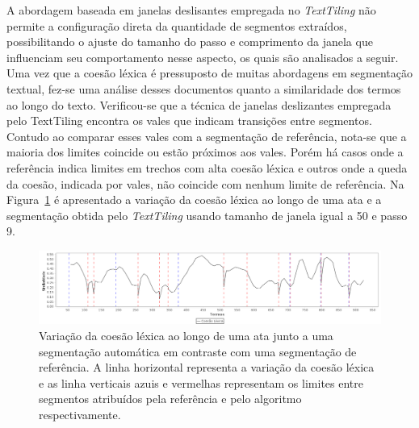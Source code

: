A abordagem baseada em janelas deslisantes empregada no \textit{TextTiling} não permite a configuração direta da quantidade de segmentos extraídos, possibilitando o ajuste do tamanho do passo e comprimento da janela que influenciam seu comportamento nesse aspecto, os quais são analisados a seguir.
Uma vez que a coesão léxica é pressuposto de muitas abordagens em segmentação textual, fez-se uma análise desses documentos quanto a similaridade dos termos ao longo do texto. Verificou-se que a técnica de janelas deslizantes empregada pelo TextTiling encontra os vales que indicam transições entre segmentos. Contudo ao comparar esses vales com a segmentação de referência, nota-se que a maioria dos limites coincide ou estão próximos aos vales. Porém há casos onde a referência indica limites em trechos com alta coesão léxica e outros onde a queda da coesão, indicada por vales, não coincide com nenhum limite de referência.  
Na Figura~\ref{fig:coesaolexicaTT} é apresentado a variação da coesão léxica ao longo de uma ata e a segmentação obtida pelo \textit{TextTiling} usando tamanho de janela igual a 50 e passo 9. 


  \begin{figure}[!h]
	  \centering
	  \includegraphics[width=\textwidth]{conteudo/capitulos/figs/coesaolexicaTT-50-9.png}
	  \caption{Variação da coesão léxica ao longo de uma ata junto a uma segmentação automática em contraste com uma segmentação de referência.
	  A linha horizontal representa a variação da coesão léxica e as linha verticais azuis e vermelhas representam os limites entre segmentos atribuídos pela referência e pelo algoritmo respectivamente. 
  }
	  \label{fig:coesaolexicaTT}
  \end{figure}















